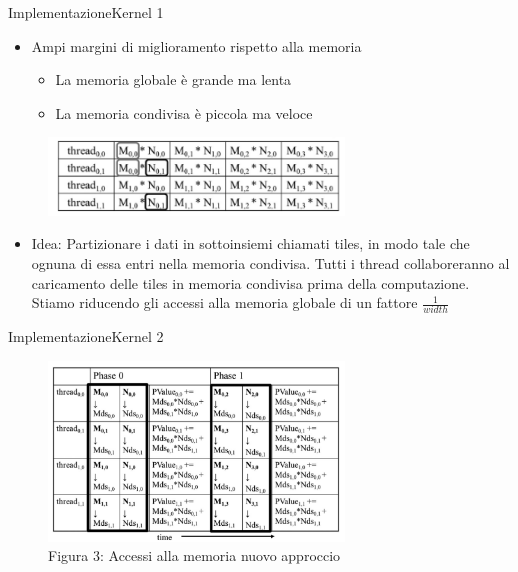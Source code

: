 \documentclass{beamer}
\begin{document}
\begin{frame}{Implementazione}{Kernel 1}
    \begin{itemize}
        \item Ampi margini di miglioramento rispetto alla memoria
              \begin{itemize}
                  \item La memoria globale è grande ma lenta
                  \item La memoria condivisa è piccola ma veloce
              \end{itemize}
    \end{itemize}
    \begin{figure}[H]
        \centering
        \includegraphics[width=0.7\textwidth]{imgs/memory_access.png}
    \end{figure}
    \begin{itemize}
        \item Idea: Partizionare i dati in sottoinsiemi chiamati tiles, in modo tale che ognuna di essa entri nella memoria condivisa. Tutti i thread collaboreranno al caricamento delle tiles in memoria condivisa prima della computazione. Stiamo riducendo gli accessi alla memoria globale di un fattore $\frac{1}{width}$
    \end{itemize}
\end{frame}

\begin{frame}{Implementazione}{Kernel 2}
    \begin{figure}[H]
        \centering
        \includegraphics[width=0.7\textwidth]{imgs/memory_access1.png}
        \caption{Figura 3: Accessi alla memoria nuovo approccio}
    \end{figure}
\end{frame}
\end{document}

